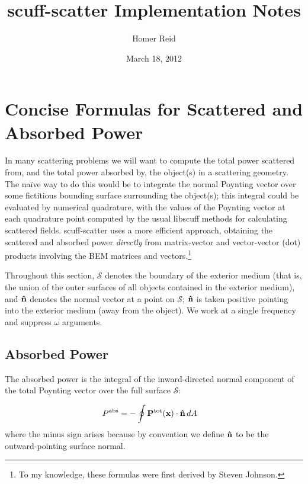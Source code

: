 \documentclass[letterpaper]{article}
\title {{\sc scuff-scatter} Implementation Notes}
\author {Homer Reid}
\date {March 18, 2012}
\begin{document}
\pagestyle{myheadings}
\maketitle

\tableofcontents

\newpage
\section{Concise Formulas for Scattered and Absorbed Power}

In many scattering problems we will want to compute the total
power scattered from, and the total power absorbed by, the
object(s) in a scattering geometry.  The na\"ive way to do 
this would be to integrate the normal Poynting vector over
some fictitious bounding surface surrounding the object(s);
this integral could be evaluated by numerical quadrature,
with the values of the Poynting vector at each quadrature
point computed by the usual {\sc libscuff} methods for
calculating scattered fields. {\sc scuff-scatter} uses a 
more efficient approach, obtaining the scattered and absorbed 
power \textit{directly} from matrix-vector and vector-vector 
(dot) products involving the BEM matrices and 
vectors.\footnote{To my knowledge, these formulas were first
derived by Steven Johnson.}

Throughout this section, $\mathcal{S}$ denotes the boundary
of the exterior medium (that is, the union of the outer surfaces
of all objects contained in the exterior medium), and 
$\mathbf{\hat n}$ denotes the normal vector at a point on 
$\mathcal{S}$; $\mathbf{\hat n}$ is taken positive pointing
into the exterior medium (away from the object).
We work at a single frequency and suppress $\omega$ arguments.

\subsection{Absorbed Power}

The absorbed power is the integral of the inward-directed normal 
component of the total Poynting vector over the full surface
$\mathcal{S}$:

\begin{align}
 P^{\hbox{\scriptsize{abs}}} 
&= - \oint \mathbf{P}^{\hbox{\scriptsize{tot}}}(\mathbf{x}) \cdot \mathbf{\hat n} \, dA 
\label{AbsorbedPower}
\end{align}
where the minus sign arises because by convention we define $\mathbf{\hat n}$ 
to be the outward-pointing surface normal.
\end{document}
